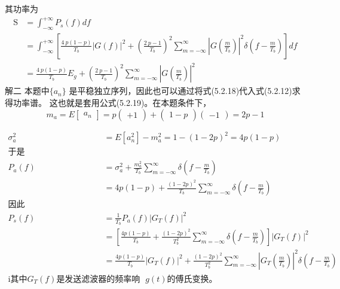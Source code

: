 \documentclass[utf8]{article}
\begin{document}
其功率为
$$\begin{aligned}\text{S}&=\int_{-\infty}^{+\infty}P_{s}(f)df\\&=\int_{-\infty}^{+\infty}\left[\frac{4\:p\left(1-p\right)}{T_{b}}\Big|G\left(f\right)\Big|^{2}+\left(\frac{2\:p-1}{T_{b}}\right)^{2}\sum_{m=-\infty}^{\infty}\left|G\left(\frac{m}{T_{b}}\right)\right|^{2}\delta\left(f-\frac{m}{T_{b}}\right)\right]df\\&=\frac{4\:p\left(1-p\right)}{T_{b}}E_{g}+\left(\frac{2\:p-1}{T_{b}}\right)^{2}\sum_{m=-\infty}^{\infty}\left|G\left(\frac{m}{T_{b}}\right)\right|^{2}\end{aligned}$$
解二 本题中$\{a_n\}$ 是平稳独立序列，因此也可以通过将式(5.2.18)代入式(5.2.12)求得功率谱。
这也就是套用公式(5.2.19)。在本题条件下，
$$m_a=E\begin{bmatrix}a_n\end{bmatrix}=p\begin{pmatrix}+1\end{pmatrix}+\begin{pmatrix}1-p\end{pmatrix}\begin{pmatrix}-1\end{pmatrix}=2p-1$$

\begin{equation}
\begin{aligned}
\sigma_{a}^{2} &= E\left[ a_{n}^{2} \right] - m_{a}^{2} = 1 - \left(1 - 2p\right)^{2} = 4p\left(1 - p\right) \\
\text{于是} \\
P_{a}(f) &= \sigma_{a}^{2} + \frac{m_{a}^{2}}{T_{b}} \sum_{m=-\infty}^{\infty} \delta\left(f - \frac{m}{T_{b}}\right) \\
&= 4p\left(1 - p\right) + \frac{\left(1 - 2p\right)^{2}}{T_{b}} \sum_{m=-\infty}^{\infty} \delta\left(f - \frac{m}{T_{b}}\right) \\
\text{因此} \\
P_{s}\left(f\right) &= \frac{1}{T_{b}} P_{a}\left(f\right) \left|G_{T}\left(f\right)\right|^{2} \\
&= \left[\frac{4p\left(1 - p\right)}{T_{b}} + \frac{\left(1 - 2p\right)^{2}}{T_{b}^{2}} \sum_{m=-\infty}^{\infty} \delta\left(f - \frac{m}{T_{b}}\right)\right] \left|G_{T}\left(f\right)\right|^{2} \\
&= \frac{4p\left(1 - p\right)}{T_{b}} \left|G_{T}\left(f\right)\right|^{2} + \frac{\left(1 - 2p\right)^{2}}{T_{b}^{2}} \sum_{m=-\infty}^{\infty} \left|G_{T}\left(\frac{m}{T_{b}}\right)\right|^{2} \delta\left(f - \frac{m}{T_{b}}\right) \\
\text{i} \text{其中} G_{T}\left(f\right) \text{是发送滤波器的频率响应,也即本题中} g(t) \text{的傅氏变换。} \\
\end{aligned}
\end{equation}
\end{document}
